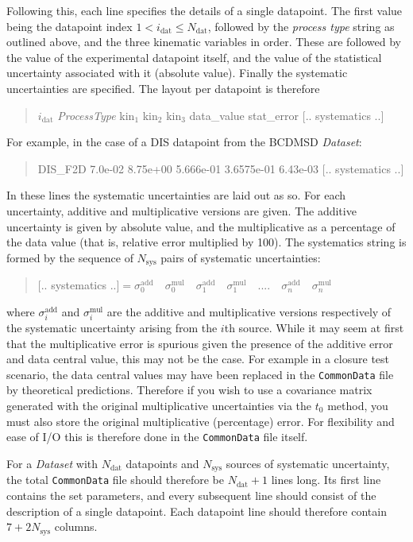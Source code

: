 \documentclass[11pt]{article}
\begin{document}
Following this, each line specifies the details of a single datapoint. The first
value being the datapoint index $1< i_{\text{dat}} \leq N_{\mathrm{dat}}$,
followed by the \emph{process type} string as outlined above, and the three
kinematic variables in order. These are followed by the value of the
experimental datapoint itself, and the value of the statistical uncertainty
associated with it (absolute value). Finally the systematic uncertainties are
specified. The layout per datapoint is therefore
%
\begin{quotation}\noindent
$i_{\mathrm{dat}}$   \emph{ProcessType} kin$_1$ kin$_2$ kin$_3$ data\_value stat\_error  $[..$ systematics $..]$
\end{quotation}
%
For example, in the case of a DIS datapoint from the BCDMSD \emph{Dataset}:
%
\begin{quotation}    DIS\_F2D 7.0e-02   8.75e+00   5.666e-01   3.6575e-01   6.43e-03 $[..$ systematics $..]$
\end{quotation}
%
In these lines the systematic uncertainties are laid out as so. For each
uncertainty, additive and multiplicative versions are given. The additive
uncertainty is given by absolute value, and the multiplicative as a percentage
of the data value (that is, relative error multiplied by 100). The systematics
string is formed by the sequence of $N_{\text{sys}}$ pairs of systematic
uncertainties:
\begin{quotation}\noindent
$[..$ systematics $..] =  \sigma^{\mathrm{add}}_0 \quad  \sigma^{\mathrm{mul}}_0\quad \sigma^{\mathrm{add}}_1 \quad \sigma^{\mathrm{mul}}_1 \quad....\quad \sigma^{\mathrm{add}}_n  \quad\sigma^{\mathrm{mul}}_n$
\end{quotation}
where $\sigma^{\mathrm{add}}_i$ and $\sigma^{\mathrm{mul}}_i$ are the additive
and multiplicative versions respectively of the systematic uncertainty arising
from the $i$th source. While it may seem at first that the multiplicative error
is spurious given the presence of the additive error and data central value,
this may not be the case. For example in a closure test scenario, the data
central values may have been replaced in the {\tt CommonData} file by
theoretical predictions. Therefore if you wish to use a covariance matrix
generated with the original multiplicative uncertainties via the $t_0$ method,
you must also store the original multiplicative (percentage) error. For
flexibility and ease of I/O this is therefore done in the {\tt CommonData} file
itself.

For a \emph{Dataset} with $N_{\text{dat}}$ datapoints and $N_{\text{sys}}$
sources of systematic uncertainty, the total {\tt CommonData} file should
therefore be $N_{\text{dat}}+1$ lines long. Its first line contains the set
parameters, and every subsequent line should consist of the description of a
single datapoint. Each datapoint line should therefore contain $7 +
2N_{\text{sys}}$ columns.
\end{document}
